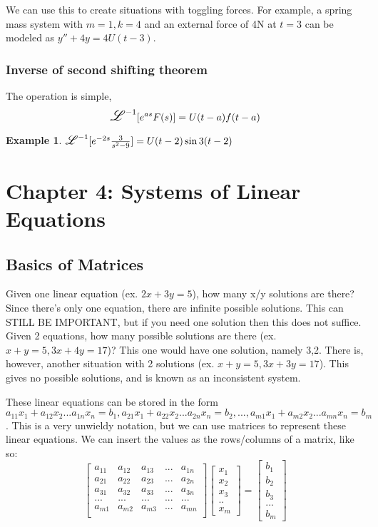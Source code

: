 \documentclass{article}
\newtheorem{example}{Example}
\newcommand\laplace{\mathlarger{\mathlarger{\mathscr{L}}}}
\begin{document}
We can use this to create situations with toggling forces. For example, a 
spring mass system with $m=1,k=4$ and an external force of 4N at $t=3$
can be modeled as $y''+4y=4U(t-3)$.

\subsubsection{Inverse of second shifting theorem}

The operation is simple, $$\laplace^{-1}[e^{as}F(s)]=U(t-a)f(t-a)$$

\begin{example}
	$\laplace^{-1}[e^{-2s}\frac{3}{s^2-9}]=U(t-2)\sin{3(t-2)}$
\end{example}

\section{Chapter 4: Systems of Linear Equations}

\subsection{Basics of Matrices}
Given one linear equation (ex. $2x+3y=5$), how many x/y solutions are there? Since there's only one equation, there are infinite possible solutions. 
This can STILL BE IMPORTANT, but if you need one solution then this does not suffice.
Given 2 equations, how many possible solutions are there (ex. $x+y=5, 3x+4y=17$)? This one would have one solution, namely 3,2. There is, however, another 
situation with 2 solutions (ex. $x+y=5, 3x+3y=17$). This gives no possible solutions, and is known as an inconsistent system.

These linear equations can be stored in the form $a_{11}x_1+a_{12}x_2...a_{1n}x_n=b_1, a_{21}x_1+a_{22}x_2...a_{2n}x_n=b_2, ..., a_{m1}x_1+a_{m2}x_2...a_{mn}x_n=b_m$. 
This is a very unwieldy notation, but we can use matrices to represent these linear equations. We can insert the values as the rows/columns of a matrix, like so:
$$
\begin{bmatrix}
	a_{11} & a_{12} & a_{13} & ... & a_{1n} \\
	a_{21} & a_{22} & a_{23} & ... & a_{2n} \\
	a_{31} & a_{32} & a_{33} & ... & a_{3n} \\
	... & ... & ... & ... & ... \\
	a_{m1} & a_{m2} & a_{m3} & ... & a_{mn} \\
\end{bmatrix}
\begin{bmatrix}x_1 \\ x_2 \\ x_3 \\ .. \\ x_m\end{bmatrix} = \begin{bmatrix} b_1 \\ b_2 \\ b_3 \\ ... \\ b_m \end{bmatrix}
$$
\end{document}
